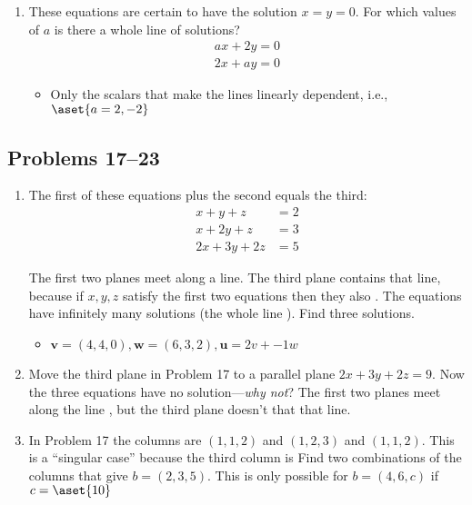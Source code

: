 \begin{itemize}
\begin{enumerate}
    \item These equations are certain to have the solution \( x = y = 0 \). For which
      values of \(a\) is there a whole line of solutions?
      \begin{align*}
        ax + 2y = 0 \\
        2x + ay = 0
      \end{align*}
      \begin{itemize}\color{foreground}
        \item Only the scalars that make the lines linearly dependent, i.e., \(
          \aset{a = 2, -2} \)
      \end{itemize}

  \end{enumerate}

  \subsection{Problems 17--23}
  \begin{enumerate}[resume]\color{foreground-2}
    \addtocounter{enumi}{5}
    \item The first of these equations plus the second equals the third:
      \begin{align*}
        x + y + z &= 2 \\
        x + 2y + z &= 3 \\
        2x + 3y + 2z &= 5
      \end{align*}

      The first two planes meet along a line. The third plane contains that
      line, because if \( x, y, z \) satisfy the first two equations then they
      also . The equations have infinitely many solutions (the whole line ). Find
      three solutions.
      \begin{itemize}\color{foreground}
        \item \( \bm{v} = (4,4,0), \bm{w} = (6,3,2), \bm{u} = 2v + -1w\)
      \end{itemize}

    \item Move the third plane in Problem 17 to a parallel plane \( 2x + 3y + 2z =
      9 \). Now the three equations have no solution---\textit{why not}? The first two planes
      meet along the line , but the third plane doesn't that
       that line.

    \item In Problem 17 the columns are \( (1,1,2) \) and \( (1,2,3) \) and \(
      (1,1,2) \). This is a ``singular case'' because the third column is
       Find two combinations of the columns that give
      \( b = (2,3,5) \). This is only possible for \( b = (4,6,c) \) if \(c = \aset{10}\)


\end{enumerate}
\end{itemize}
